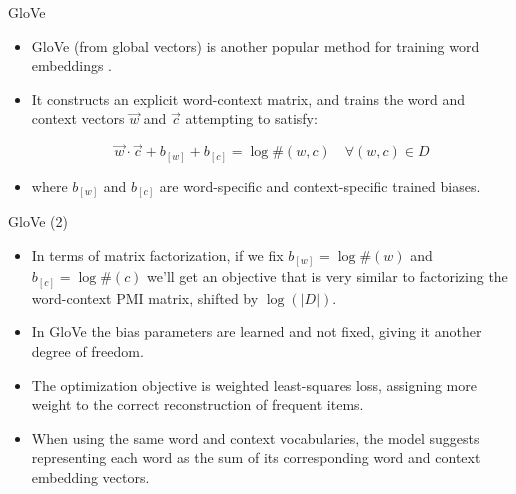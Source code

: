 \documentclass[handout]{beamer}
\begin{document}
\begin{frame}{GloVe}
\begin{scriptsize}
\begin{itemize}
\item  GloVe (from global vectors) is another popular method for training word embeddings \cite{penningtonSM14}.

\item It constructs an explicit word-context
matrix, and trains the word and context vectors $\vec{w}$ and $\vec{c}$ attempting to satisfy:

\begin{equation}
\vec{w} \cdot \vec{c} + b_{[w]}+b_{[c]} = \log \#(w,c) \quad \forall (w,c) \in D
\end{equation}

\item where $b_{[w]}$ and $b_{[c]}$ are word-specific and context-specific trained biases.

        
\end{itemize}
\end{scriptsize}
\end{frame}



\begin{frame}{GloVe (2)}
\begin{scriptsize}
\begin{itemize}

\item In terms of matrix factorization, if we fix $b_{[w]}=\log \#(w)$ and $b_{[c]}=\log \#(c)$ we'll get an objective that is very similar to factorizing the word-context PMI matrix, shifted by $\log (|D|)$.
\item In GloVe the bias parameters are learned and not fixed, giving it another degree of freedom.

\item The optimization objective is weighted least-squares loss, assigning more weight to the correct reconstruction of frequent items.
       
\item When using the same word and context vocabularies, the model suggests representing each word as the sum of its corresponding word and context embedding vectors.   
        
\end{itemize}
\end{scriptsize}
\end{frame}
\end{document}
